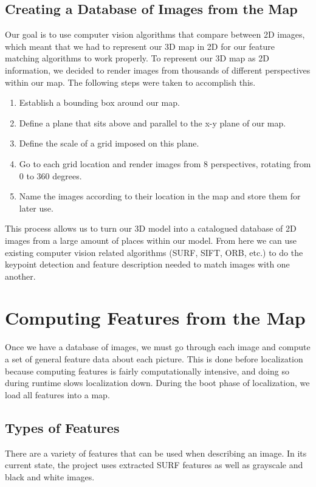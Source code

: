 \documentclass[a4paper,11pt]{article}
\begin{document}
  \subsection{Creating a Database of Images from the Map}
  Our goal is to use computer vision algorithms that compare between 2D images, which meant that we had to represent our 3D map in 2D for our feature matching algorithms to work properly. To represent our 3D map as 2D information, we decided to render images from thousands of different perspectives within our map. The following steps were taken to accomplish this.
  \begin{enumerate}
  \item Establish a bounding box around our map.
  \item Define a plane that sits above and parallel to the x-y plane of our map.
  \item Define the scale of a grid imposed on this plane.
  \item Go to each grid location and render images from 8 perspectives, rotating from 0 to 360 degrees.
  \item Name the images according to their location in the map and store them for later use.
  \end{enumerate}

  This process allows us to turn our 3D model into a catalogued database of 2D images from a large amount of places within our model. From here we can use existing computer vision related algorithms (SURF, SIFT, ORB, etc.) to do the keypoint detection and feature description needed to match images with one another.


  \section{Computing Features from the Map}
Once we have a database of images, we must go through each image and compute a set of general feature data about each picture. This is done before localization because computing features is fairly computationally intensive, and doing so during runtime slows localization down. During the boot phase of localization, we load all features into a map.

  \subsection{Types of Features}
There are a variety of features that can be used when describing an image. In its current state, the project uses extracted SURF features as well as grayscale and black and white images.
\end{document}
